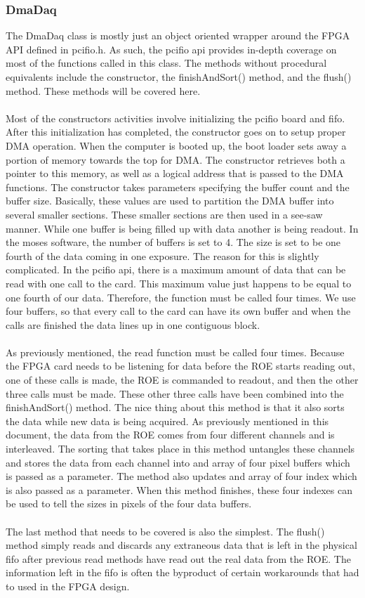 \subsubsection{DmaDaq}
The DmaDaq class is mostly just an object oriented wrapper around the FPGA API defined in pcifio.h. As such, the
pcifio api provides in-depth coverage on most of the functions called in this class. The methods without procedural
equivalents include the constructor, the finishAndSort() method, and the flush() method. These methods will be
covered here.\\
\\
Most of the constructors activities involve initializing the pcifio board and fifo. After this initialization has
completed, the constructor goes on to setup proper DMA operation. When the computer is booted up, the boot loader
sets away a portion of memory towards the top for DMA. The constructor retrieves both a pointer to this memory, as
well as a logical address that is passed to the DMA functions. The constructor takes parameters specifying the 
buffer count and the buffer size. Basically, these values are used to partition the DMA buffer into several smaller
sections. These smaller sections are then used in a see-saw manner. While one buffer is being filled up with data
another is being readout. In the moses software, the number of buffers is set to 4. The size is set to be one fourth
of the data coming in one exposure. The reason for this is slightly complicated. In the pcifio api, there is a maximum
amount of data that can be read with one call to the card. This maximum value just happens to be equal to one fourth of
our data. Therefore, the function must be called four times. We use four buffers, so that every call to the card can 
have its own buffer and when the calls are finished the data lines up in one contiguous block.\\
\\
As previously mentioned, the read function must be called four times. Because the FPGA card needs to be listening for
data before the ROE starts reading out, one of these calls is made, the ROE is commanded to readout, and then the other
three calls must be made. These other three calls have been combined into the finishAndSort() method. The nice thing about
this method is that it also sorts the data while new data is being acquired. As previously mentioned in this document, the
data from the ROE comes from four different channels and is interleaved. The sorting that takes place in this method
untangles these channels and stores the data from each channel into and array of four pixel buffers which is passed
as a parameter. The method also updates and array of four index which is also passed as a parameter. When this method
finishes, these four indexes can be used to tell the sizes in pixels of the four data buffers.\\
\\
The last method that needs to be covered is also the simplest. The flush() method simply reads and discards any extraneous
data that is left in the physical fifo after previous read methods have read out the real data from the ROE. The 
information left in the fifo is often the byproduct of certain workarounds that had to used in the FPGA design.

